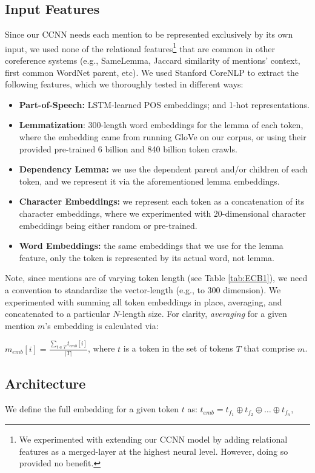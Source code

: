 \documentclass[11pt,a4paper]{article}
\begin{document}
\subsection{Input Features}
\label{sec:features}
Since our CCNN needs each mention to be represented exclusively by its own input, we used none of the relational features\footnote{We experimented with extending our CCNN model by adding relational features as a merged-layer at the highest neural level.  However, doing so provided no benefit.} that are common in other coreference systems (e.g., SameLemma, Jaccard similarity of mentions' context, first common WordNet parent, etc).  We used Stanford CoreNLP \cite{manning-EtAl:2014:P14-5} to extract the following features, which we thoroughly tested in different ways:
\begin{itemize}
  \item \textbf{Part-of-Speech:} LSTM-learned POS embeddings; and 1-hot representations.
  \item \textbf{Lemmatization}: 300-length word embeddings for the lemma of each token, where the embedding came from running GloVe \cite{pennington2014glove} on our corpus, or using their provided pre-trained 6 billion and 840 billion token crawls.
  \item \textbf{Dependency Lemma:} we use the dependent parent and/or children of each token, and we represent it via the aforementioned lemma embeddings.
  \item \textbf{Character Embeddings:} we represent each token as a concatenation of its character embeddings, where we experimented with 20-dimensional character embeddings being either random or pre-trained.
  \item \textbf{Word Embeddings:} the same embeddings that we use for the lemma feature, only the token is represented by its actual word, not lemma.
\end{itemize}
Note, since mentions are of varying token length (see Table \ref{tab:ECB1}), we need a convention to standardize the vector-length (e.g., to 300 dimension).  We experimented with summing all token embeddings in place, averaging, and concatenated to a particular $N$-length size.  For clarity, \textit{averaging} for a given mention $m$'s embedding is calculated via:

$m_{emb}[i] = \frac{\sum_{t \in T}t_{emb}[i]}{|T|}$, where $t$ is a token in the set of tokens $T$ that comprise $m$.

\subsection{Architecture}
We define the full embedding for a given token $t$ as: $t_{emb} = t_{f_{1}} \oplus t_{f_{2}} \oplus \ldots \oplus t_{f_{n}},$
\end{document}
